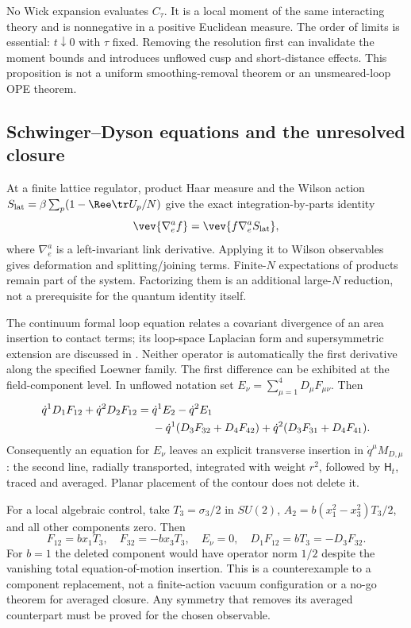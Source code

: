 No Wick expansion evaluates $C_\tau$. It is a local moment of
the same interacting theory and is nonnegative in a positive
Euclidean measure. The order of limits is essential: $t\downarrow0$
with $\tau$ fixed. Removing the resolution first can invalidate
the moment bounds and introduces unflowed cusp and short-distance
effects. This proposition is not a uniform smoothing-removal
theorem or an unsmeared-loop OPE theorem.

\subsection{Schwinger--Dyson equations and the unresolved closure}

At a finite lattice regulator, product Haar measure and the
Wilson action
$S_{\rm lat}=\beta\sum_p(1-\Ree\tr U_p/N)$ give the exact
integration-by-parts identity
\begin{equation}\label{eq:trace-lattice-sd}
 \vev{\nabla_e^a f}=\vev{f\nabla_e^aS_{\rm lat}},
\end{equation}
where $\nabla_e^a$ is a left-invariant link derivative. Applying
it to Wilson observables gives deformation and splitting/joining
terms. Finite-$N$ expectations of products remain part of the
system. Factorizing them is an additional large-$N$ reduction,
not a prerequisite for the quantum identity itself.

The continuum formal loop equation relates a covariant divergence
of an area insertion to contact terms; its loop-space Laplacian
form and supersymmetric extension are discussed in
\cite[Lecture~3]{MakeenkoLoops}. Neither operator is automatically
the first derivative along the specified Loewner family.
The first difference can be exhibited at the field-component
level. In unflowed notation set $E_\nu=\sum_{\mu=1}^4D_\mu F_{\mu\nu}$.
Then
\begin{align}\label{eq:trace-transverse-residual}
 \dot q^1D_1F_{12}+\dot q^2D_2F_{12}
 ={}&\dot q^1E_2-\dot q^2E_1\\
 &-\dot q^1(D_3F_{32}+D_4F_{42})
   +\dot q^2(D_3F_{31}+D_4F_{41}).\notag
\end{align}
Consequently an equation for $E_\nu$ leaves an explicit transverse
insertion in $\dot q^\mu M_{D,\mu}$: the second line, radially
transported, integrated with weight $r^2$, followed by
$\mathsf H_t$, traced and averaged. Planar placement of the
contour does not delete it.

For a local algebraic control, take $T_3=\sigma_3/2$ in $SU(2)$,
$A_2=b(x_1^2-x_3^2)T_3/2$, and all other components zero. Then
\begin{equation}\label{eq:trace-eom-control}
 F_{12}=b x_1T_3,\quad F_{32}=-b x_3T_3,\quad E_\nu=0,
 \quad D_1F_{12}=bT_3=-D_3F_{32}.
\end{equation}
For $b=1$ the deleted component would have operator norm $1/2$
despite the vanishing total equation-of-motion insertion. This
is a counterexample to a component replacement, not a finite-action
vacuum configuration or a no-go theorem for averaged closure.
Any symmetry that removes its averaged counterpart must be proved
for the chosen observable.

